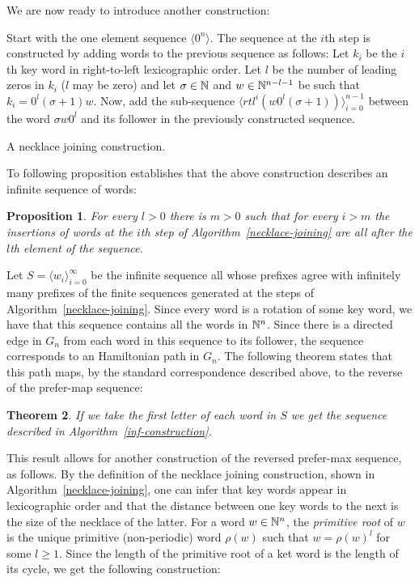 \documentclass{article} %
\newtheorem{theorem}{Theorem} \newtheorem{proposition}[theorem]{Proposition}
\theoremstyle{definition} \newtheorem{definition}[theorem]{Definition}
\newcommand{\T}[1]{\langle{#1}\rangle} \newcommand{\rr}[2]{R^{#2}({#1})}
\begin{document}
	We are now ready to introduce another construction:
	
	
	\begin{algorithm}[!h] 
		Start with the one element sequence $\T{0^n}$. The
		sequence at the $i$th step is constructed by adding words to the previous
		sequence as follows: Let $k_i$ be the $i$th key word in right-to-left
		lexicographic order. Let $l$ be the number of leading zeros in $k_i$ ($l$ may
		be zero) and let $\sigma \in {\mathbb{N}}$ and $w\in{\mathbb{N}}^{n-l-1}$ be such that
		$k_i=0^l(\sigma+1)w$. Now, add the sub-sequence
		$\T{rtl^i(w0^l(\sigma+1))}_{i=0}^{n-1}$ between the word $\sigma w 0^l$ and its
		follower in the previously constructed sequence. 
		\caption{A necklace joining construction.} \label{necklace-joining} 
	\end{algorithm}
	
	To following proposition establishes that the above construction describes an
	infinite sequence of words:
	
	\begin{proposition} 
		For every $l>0$ there is $m>0$ such that for every $i>m$
		the insertions of words at the $i$th step of Algorithm~\ref{necklace-joining}
		are all after the $l$th element of the sequence. 
	\end{proposition}
	
	Let $S=\T{w_i}_{i=0}^\infty$ be the infinite sequence all whose prefixes agree
	with infinitely many prefixes of the finite sequences generated at the steps of
	Algorithm~\ref{necklace-joining}. Since every word is a rotation of some key
	word, we have that this sequence contains all the words in ${\mathbb{N}}^n$. Since there
	is a directed edge in $G_n$ from each word in this sequence to its follower,
	the sequence corresponds to an Hamiltonian path in $G_n$. The following theorem
	states that this path maps, by the standard correspondence described above, to
	the reverse of the prefer-map sequence:
	
	\begin{theorem} 
		If we take the first letter of each word in $S$ we get the
		sequence described in Algorithm~\ref{inf-construction}. 
	\end{theorem}
	
	This result allows for another construction of the reversed prefer-max
	sequence, as follows. By the definition of the necklace joining construction,
	shown in Algorithm~\ref{necklace-joining}, one can infer that key words appear
	in lexicographic order and that the distance between one key words to the next
	is the size of the necklace of the latter. For a word $w\in{\mathbb{N}}^n$, the
	\emph{primitive root} of $w$ is the  unique primitive (non-periodic) word
	$\rho(w)$ such that $w = \rho(w)^l$ for some $l \geq 1$. Since the length of
	the primitive root of a ket word is the length of its cycle, we get the
	following construction:
	
\end{document}
